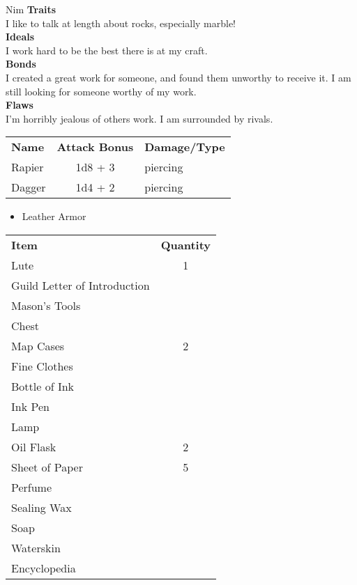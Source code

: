 \documentclass[10pt,twoside,twocolumn]{article}
\begin{document}
\begin{charactersheet}{Nim}
        \textbf{Traits} \\
        I like to talk at length about rocks, especially marble! \\

        \textbf{Ideals} \\
        I work hard to be the best there is at my craft. \\

        \textbf{Bonds} \\
        I created a great work for someone, and found them unworthy to receive
        it. I am still looking for someone worthy of my work. \\

        \textbf{Flaws} \\
        I'm horribly jealous of others work. I am surrounded by rivals. \\


        \begin{tabular}{lcl}
            \textbf{Name} & \textbf{Attack Bonus} & \textbf{Damage/Type} \\
            Rapier & 1d8 + 3 & piercing \\
            Dagger & 1d4 + 2 & piercing
        \end{tabular}

        \begin{itemize}
            \item Leather Armor
        \end{itemize}


        \begin{tabular}{lc}
            \textbf{Item} & \textbf{Quantity} \\
            Lute & 1 \\
            Guild Letter of Introduction & \\
            Mason's Tools & \\
            Chest & \\
            Map Cases & 2 \\
            Fine Clothes & \\
            Bottle of Ink & \\
            Ink Pen & \\
            Lamp & \\
            Oil Flask & 2 \\
            Sheet of Paper & 5 \\
            Perfume & \\
            Sealing Wax & \\
            Soap & \\
            Waterskin & \\
            Encyclopedia &
        \end{tabular}

        \charactercoins[silver=9, gold=24]

    \end{charactersheet}

\end{document}
